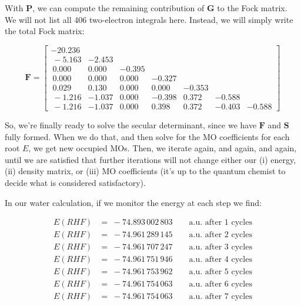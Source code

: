 \documentclass[
  9pt,
]{extbook}
\theoremstyle{definition}
\theoremstyle{definition}
\theoremstyle{definition}
\theoremstyle{remark}
\begin{document}
With \(\mathbf{P}\), we can compute the remaining contribution of \(\mathbf{G}\) to the Fock matrix. We will not list all 406 two-electron integrals here. Instead, we will simply write the total Fock matrix:

\begin{equation}
\mathbf{F}=
\begin{bmatrix}
-20.236 & & & & & & \\\ 
-5.163 & -2.453 & & & & &  \\\
0.000 & 0.000 & -0.395 & & & & \\\
0.000 & 0.000 & 0.000 & -0.327 & & & \\\
0.029 & 0.130 & 0.000 & 0.000 & -0.353 & & \\\
-1.216 & -1.037 & 0.000 & -0.398 & 0.372 & -0.588 & \\\
-1.216 & -1.037 & 0.000 & 0.398 & 0.372 & -0.403 & -0.588
\end{bmatrix}
\label{eq:fmatrix}
\end{equation}

So, we're finally ready to solve the secular determinant, since we have \(\mathbf{F}\) and \(\mathbf{S}\) fully formed. When we do that, and then solve for the MO coefficients for each root \(E\), we get new occupied MOs. Then, we iterate again, and again, and again, until we are satisfied that further iterations will not change either our (i) energy, (ii) density matrix, or (iii) MO coefficients (it's up to the quantum chemist to decide what is considered satisfactory).

In our water calculation, if we monitor the energy at each step we find:

\begin{equation}
\begin{aligned}
E(RHF) &= \; -74.893\,002\,803\qquad\text{a.u. after 1 cycles} \\
E(RHF) &= \; -74.961\,289\,145\qquad\text{a.u. after 2 cycles} \\
E(RHF) &= \; -74.961\,707\,247\qquad\text{a.u. after 3 cycles} \\
E(RHF) &= \; -74.961\,751\,946\qquad\text{a.u. after 4 cycles} \\
E(RHF) &= \; -74.961\,753\,962\qquad\text{a.u. after 5 cycles} \\
E(RHF) &= \; -74.961\,754\,063\qquad\text{a.u. after 6 cycles} \\
E(RHF) &= \; -74.961\,754\,063\qquad\text{a.u. after 7 cycles} \\
\end{aligned}
\label{eq:h2oenergies}
\end{equation}
\end{document}
